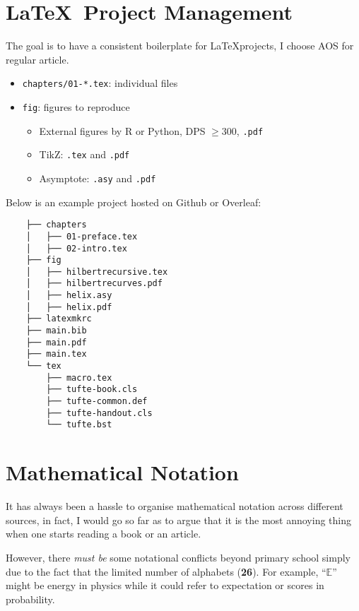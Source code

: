 \newpage


\section{\LaTeX\ Project Management}

The goal is to have a consistent boilerplate for \LaTeX projects,
I choose AOS for regular article.

\begin{itemize}
    \item \verb|chapters/01-*.tex|: individual files
    \item \verb|fig|: figures to reproduce
          \begin{itemize}
              \item External figures by \textsf{R} or Python, DPS $\geq 300$, \texttt{.pdf}
              \item TikZ: \texttt{.tex} and \texttt{.pdf}
              \item Asymptote: \texttt{.asy} and \texttt{.pdf}
          \end{itemize}
\end{itemize}

Below is an example project hosted on Github or Overleaf:

\begin{Verbatim}
    ├── chapters
    │   ├── 01-preface.tex
    │   ├── 02-intro.tex
    ├── fig
    │   ├── hilbertrecursive.tex
    │   ├── hilbertrecurves.pdf
    │   ├── helix.asy
    │   ├── helix.pdf
    ├── latexmkrc
    ├── main.bib
    ├── main.pdf
    ├── main.tex
    └── tex
        ├── macro.tex
        ├── tufte-book.cls
        ├── tufte-common.def
        ├── tufte-handout.cls
        └── tufte.bst
\end{Verbatim}

\section{Mathematical Notation}

It has always been a hassle to organise mathematical notation across different sources,
in fact, I would go so far as to argue that it is the most annoying thing
when one starts reading a book or an article.

However, there \textit{must be} some notational conflicts beyond primary school
simply due to the fact that the limited number of alphabets (\textbf{26}).
For example, ``$\mathbb{E}$'' might be energy in physics
while it could refer to expectation or scores in probability.

